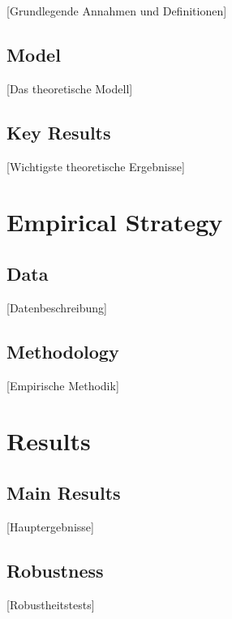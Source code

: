 \documentclass[12pt,a4paper]{article}
\begin{document}
[Grundlegende Annahmen und Definitionen]

\subsection{Model}

[Das theoretische Modell]

\subsection{Key Results}

[Wichtigste theoretische Ergebnisse]

\section{Empirical Strategy}

\subsection{Data}

[Datenbeschreibung]

\subsection{Methodology}

[Empirische Methodik]

\section{Results}

\subsection{Main Results}

[Hauptergebnisse]

\subsection{Robustness}

[Robustheitstests]

\end{document}
